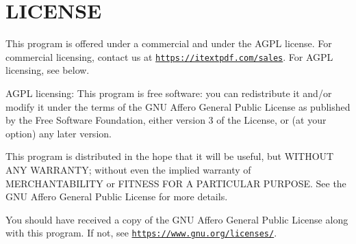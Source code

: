 \chapter{LICENSE }
\hypertarget{md_packages_2itext7_89_82_80_2_l_i_c_e_n_s_e}{}\label{md_packages_2itext7_89_82_80_2_l_i_c_e_n_s_e}
This program is offered under a commercial and under the AGPL license. For commercial licensing, contact us at \href{https://itextpdf.com/sales}{\texttt{https\+://itextpdf.\+com/sales}}. For AGPL licensing, see below.

AGPL licensing\+: This program is free software\+: you can redistribute it and/or modify it under the terms of the GNU Affero General Public License as published by the Free Software Foundation, either version 3 of the License, or (at your option) any later version.

This program is distributed in the hope that it will be useful, but WITHOUT ANY WARRANTY; without even the implied warranty of MERCHANTABILITY or FITNESS FOR A PARTICULAR PURPOSE. See the GNU Affero General Public License for more details.

You should have received a copy of the GNU Affero General Public License along with this program. If not, see \href{https://www.gnu.org/licenses/}{\texttt{https\+://www.\+gnu.\+org/licenses/}}. 